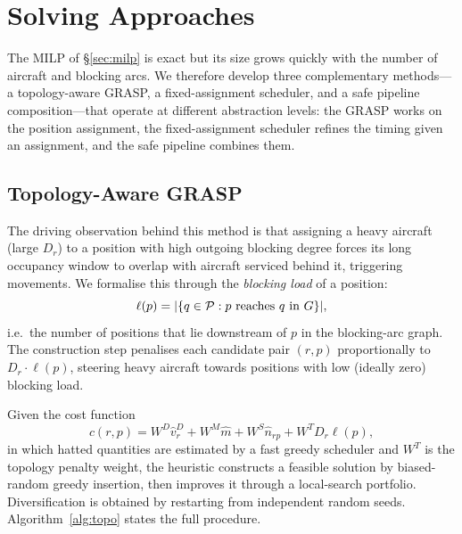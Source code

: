 \section{Solving Approaches}
\label{sec:approaches}

The MILP of \S\ref{sec:milp} is exact but its size grows quickly with the
number of aircraft and blocking arcs.  We therefore develop three
complementary methods---a topology-aware GRASP, a fixed-assignment
scheduler, and a safe pipeline composition---that operate at different
abstraction levels: the GRASP works on the position assignment, the
fixed-assignment scheduler refines the timing given an assignment, and the
safe pipeline combines them.

\subsection{Topology-Aware GRASP}
\label{sec:topo_heuristic}

The driving observation behind this method is that assigning a heavy
aircraft (large $D_r$) to a position with high outgoing blocking degree
forces its long occupancy window to overlap with aircraft serviced behind
it, triggering movements.  We formalise this through the
\emph{blocking load} of a position:
\[
  \ell(p) = |\{q \in \mathcal{P} : p \text{ reaches } q \text{ in } G\}|,
\]
i.e.\ the number of positions that lie downstream of $p$ in the
blocking-arc graph.  The construction step penalises each candidate pair
$(r, p)$ proportionally to $D_r \cdot \ell(p)$, steering heavy aircraft
towards positions with low (ideally zero) blocking load.

Given the cost function
\[
  c(r, p) = W^D \hat{v}^D_r + W^M \hat{m}
            + W^S \hat{n}_{rp} + W^T D_r \ell(p),
\]
in which hatted quantities are estimated by a fast greedy scheduler and
$W^T$ is the topology penalty weight, the heuristic constructs a feasible
solution by biased-random greedy insertion, then improves it through a
local-search portfolio.  Diversification is obtained by restarting from
independent random seeds.  Algorithm~\ref{alg:topo} states the full
procedure.

